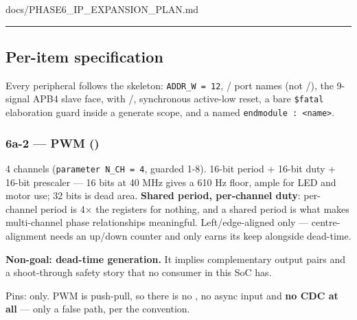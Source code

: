 \begin{relocated}{docs/PHASE6_IP_EXPANSION_PLAN.md}
{}

\begin{center}\rule{0.5\linewidth}{0.5pt}\end{center}

\subsection{Per-item specification}\label{ds:ch:phase6-ip-expansion-plan:7-per-item-specification}

Every peripheral follows the 
skeleton: \texttt{ADDR\_\allowbreak{}W\ =\allowbreak{}\ 12},
/ port names (not /), the
9-signal APB4 slave face,  with
/, synchronous active-low reset, a bare
\texttt{\$fatal} elaboration guard inside a generate scope, and a named
\texttt{endmodule\ :\allowbreak{}\ <name>}.

\subsubsection{\texorpdfstring{6a-2 --- PWM
()}{6a-2 --- PWM ()}}\label{ds:ch:phase6-ip-expansion-plan:6a-2-pwm-rtlperiphpwm-controllersv}

4 channels (\texttt{parameter\ N\_\allowbreak{}CH\ =\allowbreak{}\ 4},
guarded 1-8). 16-bit period + 16-bit duty + 16-bit prescaler --- 16 bits
at 40 MHz gives a 610 Hz floor, ample for LED and motor use; 32 bits is
dead area. \textbf{Shared period, per-channel duty}: per-channel period
is 4× the registers for nothing, and a shared period is what makes
multi-channel phase relationships meaningful.
Left/\allowbreak{}edge-aligned only --- centre-alignment needs an
up/down counter and only earns its keep alongside dead-time.

\textbf{Non-goal: dead-time generation.} It implies complementary output
pairs and a shoot-through safety story that no consumer in this SoC has.

Pins:  only. PWM is push-pull, so there is no
, no async input and \textbf{no CDC at all} --- only a
 false path, per the  convention.


\end{relocated}
